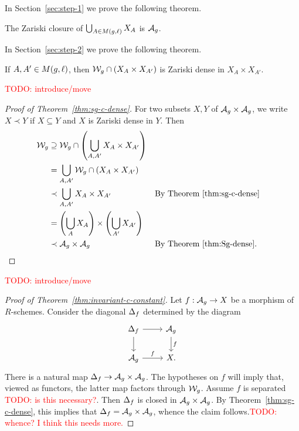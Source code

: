 \documentclass{amsart}
\begin{document}
In Section~\ref{sec:step-1} we prove the following theorem.

\begin{theorem}\label{thm:curves-dense}
  The Zariski closure of $\bigcup_{A \in M(g,\ell)} X_A$ is $\mathcal{A}_g$.
\end{theorem}

In Section~\ref{sec:step-2} we prove the following theorem.

\begin{theorem}\label{thm:Sg-dense}
  If $A,A' \in M(g,\ell)$, then $\mathcal{W}_g \cap (X_A \times X_{A'})$ is Zariski dense in $X_A \times X_{A'}$.
\end{theorem}

\textcolor{red}{TODO: introduce/move}

\begin{proof}[Proof of Theorem~\ref{thm:sg-c-dense}]
  For two subsets $X,Y$ of $\mathcal{A}_g \times \mathcal{A}_g$, we write $X \prec Y$ if $X \subseteq Y$ and $X$ is Zariski dense in $Y$. Then
  \begin{align*}
    \mathcal{W}_g
    &\supseteq
    \mathcal{W}_g \cap \left(\bigcup_{A,A'} X_A \times X_{A'}\right)
    \\
    &=
    \bigcup_{A,A'} \mathcal{W}_g \cap (X_A \times X_{A'})
    \\
    &\prec
    \bigcup_{A,A'} X_{A} \times X_{A'}
    &&\text{By Theorem~\ref{thm:sg-c-dense}}
    \\
    &=
    \left(\bigcup_{A} X_A\right) \times \left(\bigcup_{A'} X_{A'}\right)
    \\
    &\prec
    \mathcal{A}_g \times \mathcal{A}_g
    &&\text{By Theorem~\ref{thm:Sg-dense}}.
  \end{align*}
\end{proof}

\textcolor{red}{TODO: introduce/move}

\begin{proof}[Proof of Theorem~\ref{thm:invariant-c-constant}]
  Let $f: \mathcal{A}_g \to X$ be a morphism of $R$-schemes. Consider the diagonal $\Delta_f$ determined by the diagram
  \[
  \begin{tikzcd}
    \df \arrow[r] \arrow[d] & \ag \arrow[d,"f"]
    \\
    \ag \arrow[r,"f"] & X.
  \end{tikzcd}
  \]
  There is a natural map $\Delta_f \to \mathcal{A}_g \times \mathcal{A}_g$. The hypotheses on $f$ will imply that, viewed as functors, the latter map factors through $\mathcal{W}_g$.
  Assume $f$ is separated \textcolor{red}{TODO: is this necessary?}.
  Then $\Delta_f$ is closed in $\mathcal{A}_g \times \mathcal{A}_g$. By Theorem~\ref{thm:sg-c-dense}, this implies that $\Delta_f = \mathcal{A}_g \times \mathcal{A}_g$, whence the claim follows.\textcolor{red}{TODO: whence? I think this needs more.}
\end{proof}
\end{document}
